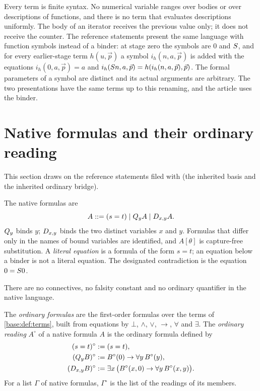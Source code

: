 \begin{remark}
\label{base:rem:nolang}
Every term is finite syntax.  No numerical variable ranges over bodies or
over descriptions of functions, and there is no term that evaluates
descriptions uniformly.  The body of an iterator receives the previous value
only; it does not receive the counter.  The reference statements present the
same language with function symbols instead of a binder: at stage zero the
symbols are $0$ and $S$, and for every earlier-stage term $h(u,\vec p)$ a
symbol $i_h(n,a,\vec p)$ is added with the equations
$i_h(0,a,\vec p)=a$ and $i_h(S n,a,\vec p)=h(i_h(n,a,\vec p),\vec p)$.
The formal parameters of a symbol are distinct and its actual arguments are
arbitrary.  The two presentations have the same terms up to this renaming,
and the article uses the binder.
\end{remark}

\section{Native formulas and their ordinary reading}
\label{base:sec:reading}

This section draws on the reference statements filed with
 (the inherited basis and the inherited ordinary
bridge).

\begin{definition}
\label{base:def:formulas}
The native formulas are
\[
 A ::= (s=t)\mid Q_{y}A \mid D_{x,y}A .
\]
$Q_{y}$ binds $y$; $D_{x,y}$ binds the two distinct variables $x$ and $y$.
Formulas that differ only in the names of bound variables are identified,
and $A[\theta]$ is capture-free substitution.  A \emph{literal equation} is
a formula of the form $s=t$; an equation below a binder is not a literal
equation.  The designated contradiction is the equation $0=S 0$.
\end{definition}

There are no connectives, no falsity constant and no ordinary quantifier in
the native language.

\begin{definition}
\label{base:def:reading}
The \emph{ordinary formulas} are the first-order formulas over the terms of
\cref{base:def:terms}, built from equations by $\bot$, $\wedge$, $\vee$,
$\to$, $\forall$ and $\exists$.  The \emph{ordinary reading} $A^\circ$ of a
native formula $A$ is the ordinary formula defined by
\begin{align*}
 (s=t)^\circ &\mathrel{:=} (s=t),\\
 (Q_{y}B)^\circ &\mathrel{:=} B^\circ(0)\to\forall y\,B^\circ(y),\\
 (D_{x,y}B)^\circ &\mathrel{:=}
   \exists x\,\bigl(B^\circ(x,0)\to\forall y\,B^\circ(x,y)\bigr).
\end{align*}
For a list $\Gamma$ of native formulas, $\Gamma^\circ$ is the list of the
readings of its members.
\end{definition}

